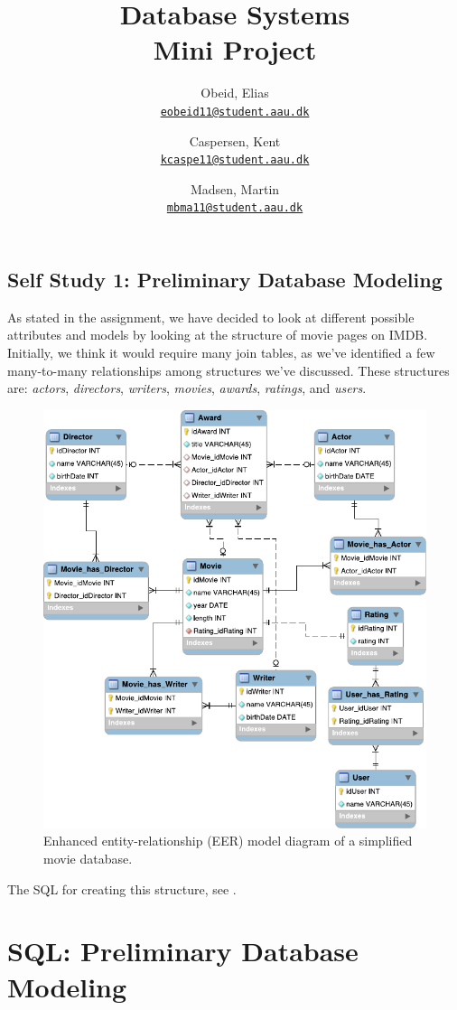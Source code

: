 \documentclass[a4paper, 12pt, twoside, article]{memoir}
\title{Database Systems\\Mini Project}
\date{\formatdate{6}{2}{2014}}
\author{
  Obeid, Elias\\
  \href{mailto:eobeid11@student.aau.dk}{\texttt{eobeid11@student.aau.dk}}
  \and
  Caspersen, Kent\\
  \href{mailto:kcaspe11@student.aau.dk}{\texttt{kcaspe11@student.aau.dk}}
  \and
  Madsen, Martin\\
  \href{mailto:mbma11@student.aau.dk}{\texttt{mbma11@student.aau.dk}}
}
\begin{document}
\frontmatter

\maketitle
\pagebreak

\mainmatter

\section{Self Study 1: Preliminary Database Modeling}
As stated in the assignment, we have decided to look at different possible attributes and models by looking at the structure of movie pages on IMDB\@. Initially, we think it would require many join tables, as we've identified a few many-to-many relationships among structures we've discussed. These structures are: \emph{actors}, \emph{directors}, \emph{writers}, \emph{movies}, \emph{awards}, \emph{ratings}, and \emph{users}.

\begin{figure}[H]
  \centering
  \includegraphics[width=\linewidth]{1-06.02.14/selfStudy1db.pdf}
  \caption{Enhanced entity-relationship (EER) model diagram of a simplified movie database.}\label{fig:model}
\end{figure}

The SQL for creating this structure, see .

\appendix

\chapter{SQL: Preliminary Database Modeling}\label{sec:sqlPre}
\inputminted{sql}{1-06.02.14/selfStudy1db.sql}
\end{document}
